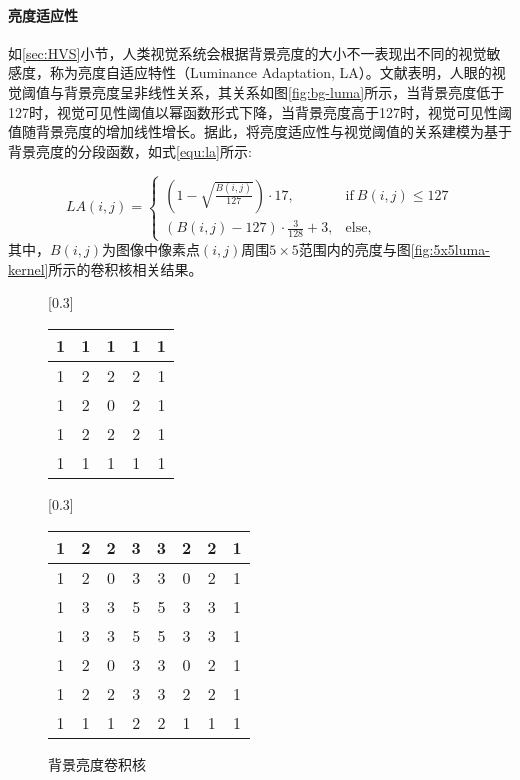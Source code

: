   \paragraph{亮度适应性} 如\ref{sec:HVS}小节，人类视觉系统会根据背景亮度的大小不一表现出不同的视觉敏感度，称为亮度自适应特性（Luminance Adaptation, LA）。文献\cite{chun-hsienchouPerceptuallyTunedSubband1995}表明，人眼的视觉阈值与背景亮度呈非线性关系，其关系如图\ref{fig:bg-luma}所示，当背景亮度低于127时，视觉可见性阈值以幂函数形式下降，当背景亮度高于127时，视觉可见性阈值随背景亮度的增加线性增长。据此，将亮度适应性与视觉阈值的关系建模为基于背景亮度的分段函数\cite{chun-hsienchouPerceptuallyTunedSubband1995}，如式\ref{equ:la}所示:

  \begin{equation} \label{equ:la}
    LA(i, j) = \begin{cases}
      \left(1 - \sqrt{\frac{B(i, j)}{127}}\right) \cdot 17, & \mathrm{if}\: B(i, j)\leq 127 \\
      \left(B(i, j) - 127\right) \cdot \frac{3}{128} + 3, &\mathrm{else},
    \end{cases}
  \end{equation}
  其中，$B(i, j)$为图像中像素点$(i, j)$周围$5\times 5$范围内的亮度与图\ref{fig:5x5luma-kernel}所示的卷积核相关结果。

  \begin{figure}
    \hspace{1cm}
		[0.3\textwidth]{
			\begin{tabular}{|c|c|c|c|c|}	\hline
				1 & 1 & 1 & 1 & 1 \\ \hline
				1 & 2 & 2 & 2 & 1 \\ \hline
				1 & 2 & 0 & 2 & 1 \\ \hline
				1 & 2 & 2 & 2 & 1 \\ \hline
				1 & 1 & 1 & 1 & 1 \\ \hline
			\end{tabular}
    }
    \hspace{2cm}
    [0.3\textwidth]{
			\begin{tabular}{|c|c|c|c|c|c|c|c|}	\hline
				1& 2& 2& 3& 3& 2& 2& 1 \\ \hline
				1& 2& 0& 3& 3& 0& 2& 1 \\ \hline
				1& 3& 3& 5& 5& 3& 3& 1 \\ \hline
				1& 3& 3& 5& 5& 3& 3& 1 \\ \hline
				1& 2& 0& 3& 3& 0& 2& 1 \\ \hline
				1& 2& 2& 3& 3& 2& 2& 1 \\ \hline
				1& 1& 1& 2& 2& 1& 1& 1 \\ \hline
			\end{tabular}
		}
    \caption{背景亮度卷积核}
	\end{figure}


